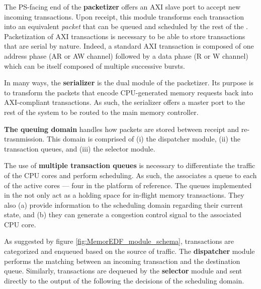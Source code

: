 The PS-facing end of the {\bf packetizer} offers an AXI slave port to
accept new incoming transactions. Upon receipt, this module transforms
each transaction into an equivalent \emph{packet} that can be queued
and scheduled by the rest of the \schim. Packetization of AXI
transactions is necessary to be able to store transactions that are
serial by nature.  Indeed, a standard AXI transaction is composed of
one address phase (AR or AW channel) followed by a data phase (R or W
channel) which can be itself composed of multiple successive bursts.

In many ways, the {\bf serializer} is the dual module of the
packetizer. Its purpose is to transform the packets that encode
CPU-generated memory requests back into AXI-compliant transactions. As
such, the serializer offers a master port to the rest of the system to
be routed to the main memory controller.


\par{\bf The queuing domain} handles how packets are stored between
receipt and re-trasnmission. This domain is comprised of (i) the
dispatcher module, (ii) the transaction queues, and (iii) the selector
module.

The use of {\bf multiple transaction queues} is necessary to
differentiate the traffic of the CPU cores and perform scheduling. As
such, the \schim associates a queue to each of the active cores ---
four in the platform of reference.
The queues implemented in the \schim not only act as a holding space
for in-flight memory transactions.  They also (a) provide information
to the scheduling domain regarding their current state, and (b) they
can generate a congestion control signal to the associated CPU core.

As suggested by figure \ref{fig:MemorEDF_module_schema}, transactions
are categorized and enqueued based on the source of traffic. The {\bf
  dispatcher} module performs the matching between an incoming
transaction and the destination queue. Similarly, transactions are
dequeued by the {\bf selector} module and sent directly to the output
of the \schim following the decisions of the scheduling
domain.

